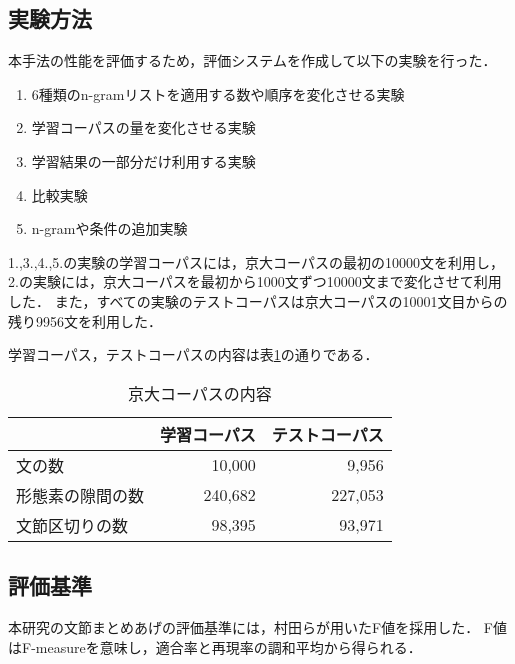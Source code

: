 \subsection{実験方法}\label{subsec:実験方法}

本手法の性能を評価するため，評価システムを作成して以下の実験を行った．

\begin{enumerate}
\item 6種類のn-gramリストを適用する数や順序を変化させる実験
\item 学習コーパスの量を変化させる実験
\item 学習結果の一部分だけ利用する実験
\item 比較実験
\item n-gramや条件の追加実験
\end{enumerate}

1.,3.,4.,5.の実験の学習コーパスには，京大コーパスの最初の10000文を利用し，2.の実験には，京大コーパスを最初から1000文ずつ10000文まで変化させて利用した．
また，すべての実験のテストコーパスは京大コーパスの10001文目からの残り9956文を利用した．

学習コーパス，テストコーパスの内容は表\ref{tab:京大コーパス}の通りである．

\begin{table}
  \begin{center}
    \caption{京大コーパスの内容}
    
    
    
    \label{tab:京大コーパス}
    \begin{tabular}{l||r|r}
      \hline
      & 学習コーパス   & テストコーパス\\
      \hline
      \hline
      文の数           & 10,000  &   9,956\\
      \hline
      形態素の隙間の数 & 240,682 & 227,053\\
      \hline
      文節区切りの数   &  98,395 &  93,971\\
      \hline
    \end{tabular}
  \end{center}
\end{table}


\subsection{評価基準}\label{subsec:評価基準}

本研究の文節まとめあげの評価基準には，村田らが用いたF値を採用した．
F値はF-measureを意味し，適合率と再現率の調和平均から得られる．

